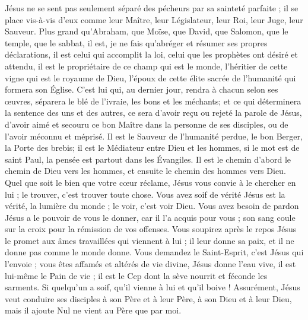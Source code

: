 Jésus ne se sent pas seulement séparé des pécheurs par sa sainteté parfaite ; il se place vis-à-vis d’eux comme leur Maître, leur Législateur, leur Roi, leur Juge, leur Sauveur.
Plus grand qu’Abraham, que Moïse, que David, que Salomon, que le temple, que le sabbat, il est, je ne fais qu’abréger et résumer ses propres déclarations, il est celui qui accomplit la loi, celui que les prophètes ont désiré et attendu, il est le propriétaire de ce champ qui est le monde, l’héritier de cette vigne qui est le royaume de Dieu, l’époux de cette élite sacrée de l’humanité qui formera son Église.
C’est lui qui, au dernier jour, rendra à chacun selon ses œuvres, séparera le blé de l’ivraie, les bons et les méchants; et ce qui déterminera la sentence des uns et des autres, ce sera d’avoir reçu ou rejeté la parole de Jésus, d’avoir aimé et secouru ce bon Maître dans la personne de ses disciples, ou de l’avoir méconnu et méprisé.
Il est le Sauveur de l’humanité perdue, le bon Berger, la Porte des brebis; il est le Médiateur entre Dieu et les hommes, \ocadr{} si le mot est de saint Paul, la pensée est partout dans les Évangiles.
Il est le chemin\frcolon{} d’abord le chemin de Dieu vers les hommes, et ensuite le chemin des hommes vers Dieu.
Quel que soit le bien que votre cœur réclame, Jésus vous convie à le chercher en lui ; \Og{} le trouver, c’est trouver toute chose\Fg{}. Vous avez soif de vérité\frcolon{} Jésus est la vérité, la lumière du monde ; le voir, c’est voir Dieu. Vous avez besoin de pardon\frcolon{} Jésus a le pouvoir de vous le donner, car il l’a acquis pour vous ; son sang coule sur la croix pour la rémission de vos offenses. Vous soupirez après le repos\frcolon{} Jésus le promet aux âmes travaillées qui viennent à lui ; il leur donne sa paix, et il ne donne pas comme le monde donne. Vous demandez le Saint-Esprit, c’est Jésus qui l’envoie ; vous êtes affamés et altérés de vie divine, Jésus donne l’eau vive, il est lui-même le Pain de vie ; il est le Cep dont la sève nourrit et féconde les sarments. Si quelqu’un a soif, qu’il vienne à lui et qu’il boive ! Assurément, Jésus veut conduire ses disciples à son Père et à leur Père, à son Dieu et à leur Dieu, mais il ajoute\frcolon{} \Og{} Nul ne vient au Père que par moi.\Fg{}

